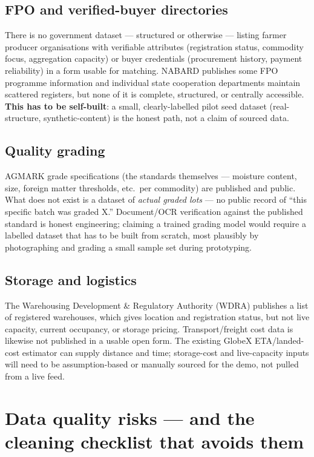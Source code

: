 \documentclass[11pt]{article}
\begin{document}
\subsection*{FPO and verified-buyer directories}
There is no government dataset --- structured or otherwise --- listing farmer producer organisations with
verifiable attributes (registration status, commodity focus, aggregation capacity) or buyer credentials
(procurement history, payment reliability) in a form usable for matching. NABARD publishes some FPO
programme information and individual state cooperation departments maintain scattered registers, but none
of it is complete, structured, or centrally accessible. \textbf{This has to be self-built}: a small,
clearly-labelled pilot seed dataset (real-structure, synthetic-content) is the honest path, not a claim of
sourced data.

\subsection*{Quality grading}
AGMARK grade specifications (the standards themselves --- moisture content, size, foreign matter thresholds,
etc.\ per commodity) are published and public. What does not exist is a dataset of \emph{actual graded
lots} --- no public record of ``this specific batch was graded X.'' Document/OCR verification against the
published standard is honest engineering; claiming a trained grading model would require a labelled dataset
that has to be built from scratch, most plausibly by photographing and grading a small sample set during
prototyping.

\subsection*{Storage and logistics}
The Warehousing Development \& Regulatory Authority (WDRA) publishes a list of registered warehouses, which
gives location and registration status, but not live capacity, current occupancy, or storage pricing.
Transport/freight cost data is likewise not published in a usable open form. The existing GlobeX
ETA/landed-cost estimator can supply distance and time; storage-cost and live-capacity inputs will need to
be assumption-based or manually sourced for the demo, not pulled from a live feed.

\clearpage
\section{Data quality risks --- and the cleaning checklist that avoids them}
\end{document}
